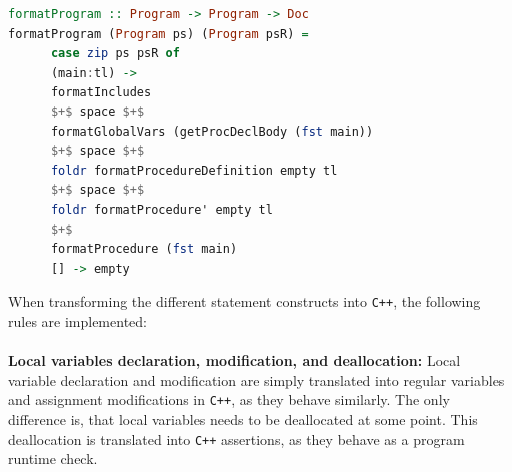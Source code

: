 \begin{lstlisting}[language=Haskell, label={lst:formatMain}, caption={Formatting AST into \texttt{C++}}]
formatProgram :: Program -> Program -> Doc
formatProgram (Program ps) (Program psR) =
      case zip ps psR of
      (main:tl) ->
      formatIncludes
      $+$ space $+$
      formatGlobalVars (getProcDeclBody (fst main))
      $+$ space $+$
      foldr formatProcedureDefinition empty tl
      $+$ space $+$
      foldr formatProcedure' empty tl
      $+$
      formatProcedure (fst main)
      [] -> empty
\end{lstlisting}
\noindent
When transforming the different statement constructs into \texttt{C++}, the following rules
are implemented:
\\
\\
\textbf{Local variables declaration, modification, and deallocation:}
Local variable declaration and modification are simply translated into regular variables and
assignment modifications in \texttt{C++}, as they behave
similarly. The only difference is, that \lan local variables needs to be deallocated at some
point. This deallocation is translated into \texttt{C++} assertions, as they behave as a
program runtime check.

